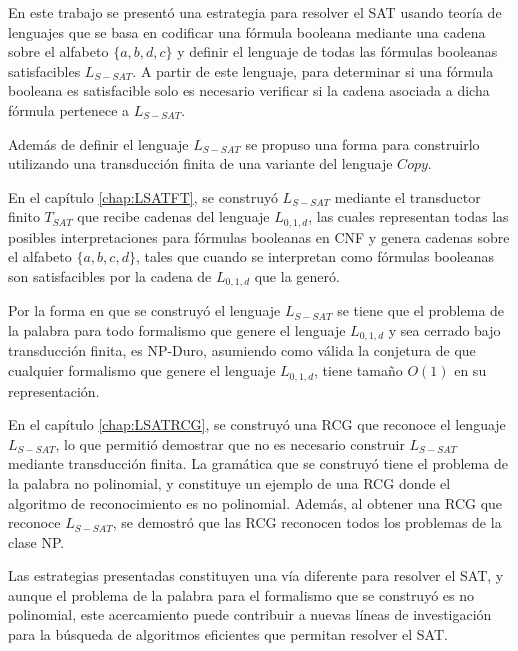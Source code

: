 \begin{conclusionsAndRecomendations}

    En este trabajo se presentó una estrategia para resolver el SAT usando teoría de lenguajes que se basa en 
    codificar una fórmula booleana mediante una cadena sobre el alfabeto $\{a,b,d,c\}$ y definir el lenguaje de 
    todas las fórmulas booleanas satisfacibles $L_{S-SAT}$. A partir de este lenguaje, para determinar si una 
    fórmula booleana es satisfacible solo es necesario verificar si la cadena asociada a dicha fórmula pertenece 
    a $L_{S-SAT}$.
    
    Además de definir el lenguaje $L_{S-SAT}$ se propuso una forma para construirlo utilizando una transducción 
    finita de una variante del lenguaje $Copy$. 
    
    En el capítulo \ref{chap:LSATFT}, se construyó $L_{S-SAT}$ mediante el transductor finito $T_{SAT}$ que 
    recibe cadenas del lenguaje $L_{0,1,d}$, las cuales representan todas las posibles interpretaciones para 
    fórmulas booleanas en CNF y genera cadenas sobre el alfabeto $\{a,b,c,d\}$, tales que cuando se interpretan 
    como fórmulas booleanas son satisfacibles por la cadena de $L_{0,1,d}$ que la generó. 
    
    Por la forma en que se construyó el lenguaje $L_{S-SAT}$ se tiene que el problema de la palabra para todo 
    formalismo que genere el lenguaje $L_{0,1,d}$ y sea cerrado bajo transducción finita, es NP-Duro, asumiendo como válida 
    la conjetura de que cualquier formalismo que genere el lenguaje $L_{0,1,d}$, tiene tamaño $O(1)$ en su 
    representación.
    
    En el capítulo \ref{chap:LSATRCG}, se construyó una RCG que reconoce el lenguaje $L_{S-SAT}$, lo que permitió demostrar que no es 
    necesario construir $L_{S-SAT}$ mediante transducción finita. La gramática que se construyó tiene el 
    problema de la palabra no polinomial, y constituye un ejemplo de una RCG donde el algoritmo de reconocimiento 
    es no polinomial.  Además, al obtener una RCG que reconoce $L_{S-SAT}$, se demostró que las 
    RCG reconocen todos los problemas de la clase NP.
    
    Las estrategias presentadas constituyen una vía diferente para resolver el SAT, y aunque el problema de 
    la palabra para el formalismo que se construyó es no polinomial, este acercamiento puede contribuir a nuevas 
    líneas de investigación para la búsqueda de algoritmos eficientes que permitan resolver el SAT.
    

\end{conclusionsAndRecomendations}
